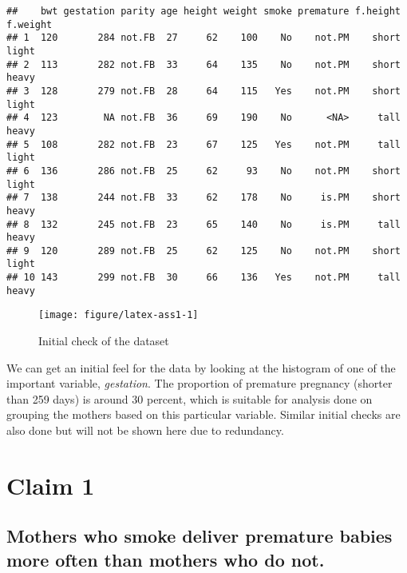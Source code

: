 \documentclass{article}\usepackage{graphicx, color}
\makeatletter
\newenvironment{kframe}{%
 \def\at@end@of@kframe{}%
 \ifinner\ifhmode%
  \def\at@end@of@kframe{\end{minipage}}%
  \begin{minipage}{\columnwidth}%
 \fi\fi%
 \def\FrameCommand##1{\hskip\@totalleftmargin \hskip-\fboxsep
 \colorbox{shadecolor}{##1}\hskip-\fboxsep
     \hskip-\linewidth \hskip-\@totalleftmargin \hskip\columnwidth}%
 \MakeFramed {\advance\hsize-\width
   \@totalleftmargin\z@ \linewidth\hsize
   \@setminipage}}%
 {\par\unskip\endMakeFramed%
 \at@end@of@kframe}
\newenvironment{knitrout}{}{} %
\makeatother
\begin{document}
\begin{knitrout}
\color{fgcolor}\begin{kframe}
\begin{verbatim}
##    bwt gestation parity age height weight smoke premature f.height  f.weight
## 1  120       284 not.FB  27     62    100    No    not.PM    short     light
## 2  113       282 not.FB  33     64    135    No    not.PM    short     heavy
## 3  128       279 not.FB  28     64    115   Yes    not.PM    short     light
## 4  123        NA not.FB  36     69    190    No      <NA>     tall     heavy
## 5  108       282 not.FB  23     67    125   Yes    not.PM     tall     light
## 6  136       286 not.FB  25     62     93    No    not.PM    short     light
## 7  138       244 not.FB  33     62    178    No     is.PM    short     heavy
## 8  132       245 not.FB  23     65    140    No     is.PM     tall     heavy
## 9  120       289 not.FB  25     62    125    No    not.PM    short     light
## 10 143       299 not.FB  30     66    136   Yes    not.PM     tall     heavy
\end{verbatim}
\end{kframe}\begin{figure}[]


{\centering \texttt{[image: figure/latex-ass1-1]} 

}

\caption[Initial check of the dataset]{Initial check of the dataset\label{fig:ass1-1}}
\end{figure}


\end{knitrout}


We can get an initial feel for the data by looking at the histogram of
one of the important variable, \textit{gestation}. The proportion of
premature pregnancy (shorter than 259 days) is around 30 percent, which is suitable for
analysis done on grouping the mothers based on this particular
variable. Similar initial checks are also done but will not be shown
here due to redundancy.


\newpage
\section*{Claim 1}
\subsection*{Mothers who smoke deliver premature babies more often
  than mothers who do not.}
\end{document}
